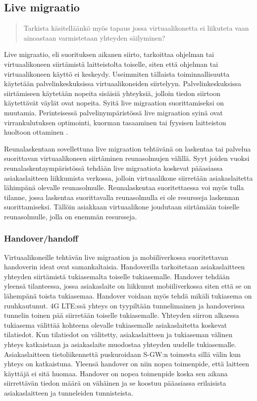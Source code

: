\subsection{Live migraatio} \label{livemigraatio}
\begin{quotation}
Tarkista käsitelläänkö myös tapaus jossa virtuaalikonetta ei liikuteta vaan ainoastaan varmistetaan yhteyden säilyminen?
\end{quotation}
Live migraatio, eli suorituksen aikanen siirto, tarkoittaa ohjelman tai virtuaalikoneen siirtämistä laitteistolta toiselle, siten että ohjelman tai virtuaalikoneen käyttö ei keskeydy. 
Useimmiten tällaista toiminnallisuutta käytetään palvelinkeskuksissa virtuaalikoneiden
siirtelyyn. Palvelinkeskuksissa siirtämiseen käytetään nopeita sisäisiä yhteyksiä,
jolloin tiedon siirtoon käytettävät väylät ovat nopeita. Syitä live migraation
suorittamiseksi on muutamia. Perinteisessä palvelinympäristössä live migraation
syinä ovat virrankulutuksen optimointi, kuorman tasaaminen tai fyysisen
laitteiston huoltoon ottaminen \cite{soni2013comparative}. 

Reunalaskentaan sovellettuna live migraation tehtävänä on laskentaa tai palvelua suorittavan virtuaalikoneen siirtäminen reunasolmujen välillä.
Syyt joiden vuoksi reunalaskentaympäristössä tehdään live migraatiota koskevat pääasiassa asiakaslaitteen liikkumista verkossa, jolloin virtuaalikone siirretään asiakaslaitetta lähimpänä olevalle  reunasolmulle. 
Reunalaskentaa suoritettaessa voi myös tulla tilanne, jossa laskentaa suorittavalla reunasolmulla ei ole resursseja laskennan suorittamiseksi. Tällöin asiakkaan virtuaalikone joudutaan siirtämään toiselle reunasolmulle, jolla on enemmän resursseja.  


\subsubsection*{Handover/handoff}%
Virtuaalikoneille tehtävän live migraation ja mobiiliverkossa suoritettavan handoverin ideat ovat samankaltaisia.
Handoverilla tarkoitetaan asiakaslaitteen yhteyden siirtämistä tukiasemalta toiselle tukiasemalle. 
Handover tehdään yleensä tilanteessa, jossa asiakaslaite on liikkunut mobiiliverkossa siten että se on lähempänä toista tukiasemaa. Handover voidaan myös tehdä mikäli tukiasema on ruuhkautunut. \cite{lähde}
4G LTE:ssä yhteys on tyypiltään tunnelimainen ja handoverissa tunnelin toinen pää siirretään toiselle tukiasemalle.
Yhteyden siirron alkaessa tukiasema välittää kohteena olevalle tukiasemalle asiakaslaitetta koskevat tilatiedot. Kun tilatiedot on välitetty, asiakaslaitteen ja tukiaseman välinen yhteys katkaistaan ja asiakaslaite muodostaa yhteyden uudelle tukiasemalle.
Asiakaslaitteen tietoliikennettä puskuroidaan S-GW:n toimesta sillä välin kun yhteys on katkaistuna. Yleensä handover on niin nopea toimenpide, että laitteen käyttäjä ei sitä huomaa.
Handover on nopea toimenpide koska sen aikana siirrettävän tiedon määrä on vähäinen ja se koostuu pääasiassa erilaisista asiakaslaitteen ja tunneleiden tunnisteista.

